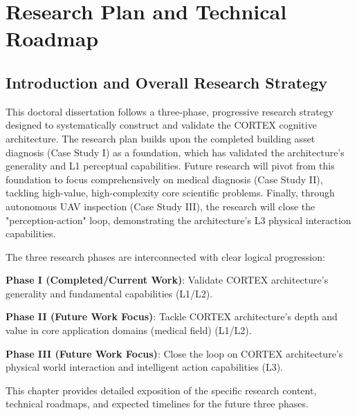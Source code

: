 
\chapter{Research Plan and Technical Roadmap} \label{app:research-plan}


\section{Introduction and Overall Research Strategy}

This doctoral dissertation follows a three-phase, progressive research strategy designed to systematically construct and validate the CORTEX cognitive architecture. The research plan builds upon the completed building asset diagnosis (Case Study I) as a foundation, which has validated the architecture's generality and L1 perceptual capabilities. Future research will pivot from this foundation to focus comprehensively on medical diagnosis (Case Study II), tackling high-value, high-complexity core scientific problems. Finally, through autonomous UAV inspection (Case Study III), the research will close the "perception-action" loop, demonstrating the architecture's L3 physical interaction capabilities.

The three research phases are interconnected with clear logical progression:

\textbf{Phase I (Completed/Current Work)}: Validate CORTEX architecture's generality and fundamental capabilities (L1/L2).

\textbf{Phase II (Future Work Focus)}: Tackle CORTEX architecture's depth and value in core application domains (medical field) (L1/L2).

\textbf{Phase III (Future Work Focus)}: Close the loop on CORTEX architecture's physical world interaction and intelligent action capabilities (L3).

This chapter provides detailed exposition of the specific research content, technical roadmaps, and expected timelines for the future three phases.

